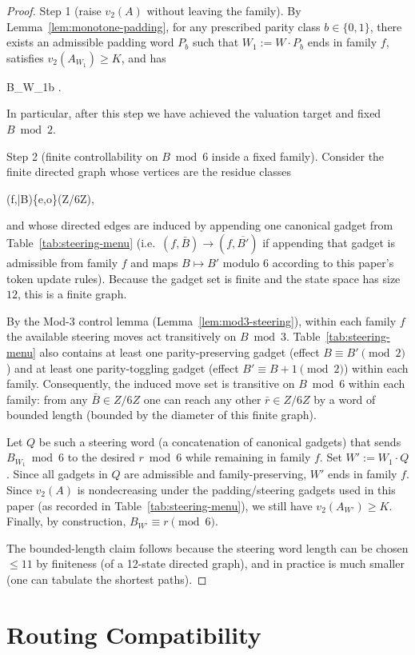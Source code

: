 \documentclass[11pt,letterpaper]{amsart}
\def\mathrm#1{#1}%
\def\mathbb#1{#1}%
\def\[{ }%
\def\]{ }%
\theoremstyle{definition}
\theoremstyle{plain}
\theoremstyle{plain}
\theoremstyle{remark}
\begin{document}
\begin{proof}
Step 1 (raise $v_2(A)$ without leaving the family).
By Lemma~\ref{lem:monotone-padding}, for any prescribed parity class $b\in\{0,1\}$,
there exists an admissible padding word $P_b$ such that $W_1 := W\cdot P_b$ ends in family $f$,
satisfies $v_2(A_{W_1})\ge K$, and has
\[
B_{W_1}\equiv b .
\]
In particular, after this step we have achieved the valuation target and fixed $B\bmod 2$.

Step 2 (finite controllability on $B\bmod 6$ inside a fixed family).
Consider the finite directed graph whose vertices are the residue classes
\[
(f,\bar B)\in\{\mathrm e,\mathrm o\}\times(\mathbb Z/6\mathbb Z),
\]
and whose directed edges are induced by appending one canonical gadget from
Table~\ref{tab:steering-menu} (i.e.\ $(f,\bar B)\to(f,\overline{B'})$ if appending that gadget is
admissible from family $f$ and maps $B\mapsto B'$ modulo $6$ according to this paper's token update rules).
Because the gadget set is finite and the state space has size $12$, this is a finite graph.

By the Mod-$3$ control lemma (Lemma~\ref{lem:mod3-steering}), within each family $f$ the available steering
moves act transitively on $B\bmod 3$. Table~\ref{tab:steering-menu} also contains at least one
parity-preserving gadget (effect $B\equiv B'\pmod 2$) and at least one parity-toggling gadget
(effect $B'\equiv B+1\pmod 2$) within each family.
Consequently, the induced move set is transitive on $B\bmod 6$ within each family: from any
$\bar B\in\mathbb Z/6\mathbb Z$ one can reach any other $\bar r\in\mathbb Z/6\mathbb Z$ by a word
of bounded length (bounded by the diameter of this finite graph).

Let $Q$ be such a steering word (a concatenation of canonical gadgets) that sends
$B_{W_1}\bmod 6$ to the desired $r\bmod 6$ while remaining in family $f$.
Set $W' := W_1\cdot Q$. Since all gadgets in $Q$ are admissible and family-preserving, $W'$ ends in family $f$.
Since $v_2(A)$ is nondecreasing under the padding/steering gadgets used in this paper (as recorded in
Table~\ref{tab:steering-menu}), we still have $v_2(A_{W'})\ge K$. Finally, by construction,
$B_{W'}\equiv r\pmod 6$.

The bounded-length claim follows because the steering word length can be chosen $\le 11$ by finiteness
(of a 12-state directed graph), and in practice is much smaller (one can tabulate the shortest paths).
\end{proof}


\section{Routing Compatibility}
\label{sec:routing-compat}
\end{document}
